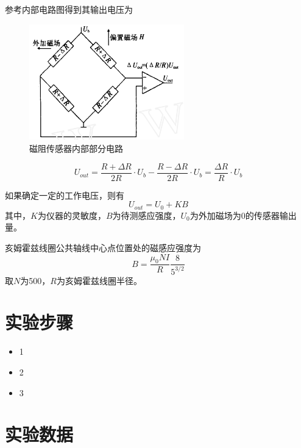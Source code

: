 \documentclass[12pt,a4paper]{article}
\begin{document}
	参考内部电路图\cite{wang2002新型磁阻传感器在地磁场测量中的应用}得到其输出电压为
	\begin{figure}[H]
		\centering
		\includegraphics[width=0.6\textwidth]{dianlu.png}
		\caption{磁阻传感器内部部分电路}
		\label{fig:0}
	\end{figure}
	\begin{equation}
		U_{out}=\frac{R+\Delta R}{2R}\cdot U_b-\frac{R-\Delta R}{2R}\cdot U_b=\frac{\Delta R}{R}\cdot U_b
	\end{equation}
	
	如果确定一定的工作电压，则有
	\begin{equation}
		U_{out}=U_0+KB
	\end{equation}
	其中，\(K\)为仪器的灵敏度，\(B\)为待测感应强度，\(U_0\)为外加磁场为0的传感器输出量。
	
	亥姆霍兹线圈公共轴线中心点位置处的磁感应强度为
	\begin{equation}
		B=\frac{\mu_0NI}{R}\frac{8}{5^{3/2}}
	\end{equation}
	取\(N\)为500，\(R\)为亥姆霍兹线圈半径。
	\section{实验步骤}
	\begin{itemize}
		\item 1
		\item 2
		\item 3

	\end{itemize}
	
	
	
	\section{实验数据}
	
	
	
\end{document}
